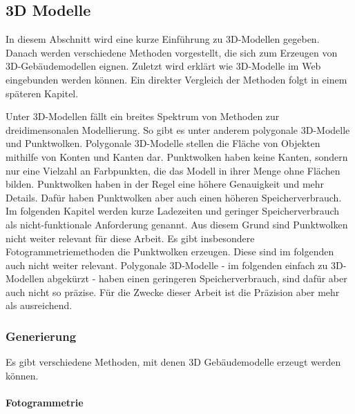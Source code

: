 \subsection{3D Modelle}
In diesem Abschnitt wird eine kurze Einführung zu 3D-Modellen gegeben. Danach werden verschiedene Methoden vorgestellt, die sich zum Erzeugen von 3D-Gebäudemodellen eignen. Zuletzt wird erklärt wie 3D-Modelle im Web eingebunden werden können. Ein direkter Vergleich der Methoden folgt in einem späteren Kapitel.

Unter 3D-Modellen fällt ein breites Spektrum von Methoden zur dreidimensonalen Modellierung. So gibt es unter anderem polygonale 3D-Modelle und Punktwolken. Polygonale 3D-Modelle stellen die Fläche von Objekten mithilfe von Konten und Kanten dar. Punktwolken haben keine Kanten, sondern nur eine Vielzahl an Farbpunkten, die das Modell in ihrer Menge ohne Flächen bilden. Punktwolken haben in der Regel eine höhere Genauigkeit und mehr Details. Dafür haben Punktwolken aber auch einen höheren Speicherverbrauch. Im folgenden Kapitel werden kurze Ladezeiten und geringer Speicherverbrauch als nicht-funktionale Anforderung genannt. Aus diesem Grund sind Punktwolken nicht weiter relevant für diese Arbeit. Es gibt insbesondere Fotogrammetriemethoden die Punktwolken erzeugen. Diese sind im folgenden auch nicht weiter relevant. Polygonale 3D-Modelle - im folgenden einfach zu 3D-Modellen abgekürzt - haben einen geringeren Speicherverbrauch, sind dafür aber auch nicht so präzise. Für die Zwecke dieser Arbeit ist die Präzision aber mehr als ausreichend.

\subsubsection{Generierung}
Es gibt verschiedene Methoden, mit denen 3D Gebäudemodelle erzeugt werden können.

\paragraph{Fotogrammetrie}


